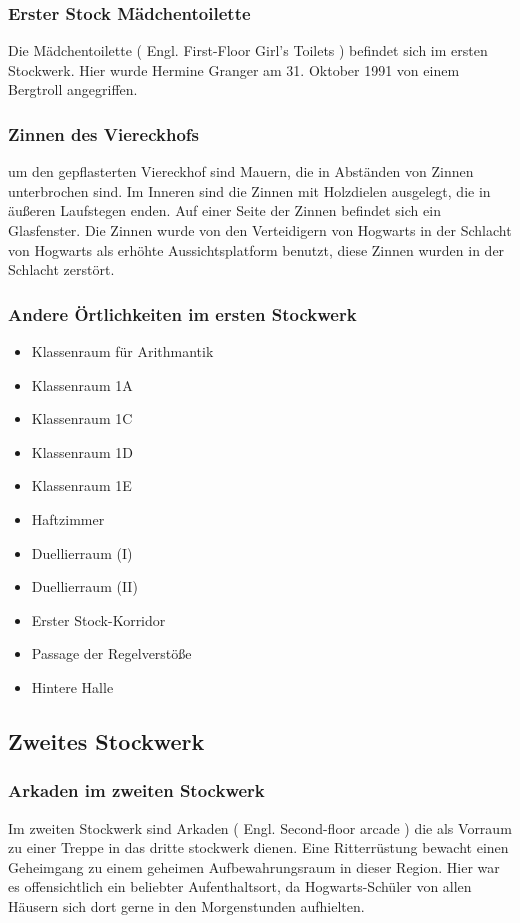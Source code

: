 \documentclass[a4paper, 10pt]{article}
\begin{document}
\subsubsection*{\large Erster Stock Mädchentoilette}
Die Mädchentoilette (  Engl.  First-Floor Girl's Toilets ) befindet sich im ersten Stockwerk. Hier wurde Hermine Granger am 31. Oktober 1991 von einem Bergtroll angegriffen.
\subsubsection*{\large Zinnen des Viereckhofs}
um den gepflasterten Viereckhof sind Mauern, die in Abständen von Zinnen unterbrochen sind. Im Inneren sind die Zinnen mit Holzdielen ausgelegt, die in äußeren Laufstegen enden. Auf einer Seite der Zinnen befindet sich ein Glasfenster. Die Zinnen wurde von den Verteidigern von Hogwarts in der Schlacht von Hogwarts als erhöhte Aussichtsplatform benutzt, diese Zinnen wurden in der Schlacht zerstört.
\subsubsection*{\large Andere Örtlichkeiten im ersten Stockwerk}
\vspace{10pt}
\begin{itemize}
    \item Klassenraum für Arithmantik
    \item Klassenraum 1A
    \item Klassenraum 1C
    \item Klassenraum 1D
    \item Klassenraum 1E
    \item Haftzimmer
    \item Duellierraum (I)
    \item Duellierraum (II)
    \item Erster Stock-Korridor
    \item Passage der Regelverstöße
    \item Hintere Halle
\end{itemize}

\subsection*{\Large Zweites Stockwerk}

\subsubsection*{\large Arkaden im zweiten Stockwerk}
Im zweiten Stockwerk sind Arkaden (  Engl.  Second-floor arcade ) die als Vorraum zu einer Treppe in das dritte stockwerk dienen. Eine Ritterrüstung bewacht einen Geheimgang zu einem geheimen Aufbewahrungsraum in dieser Region. Hier war es offensichtlich ein beliebter Aufenthaltsort, da Hogwarts-Schüler von allen Häusern sich dort gerne in den Morgenstunden aufhielten.
\end{document}
